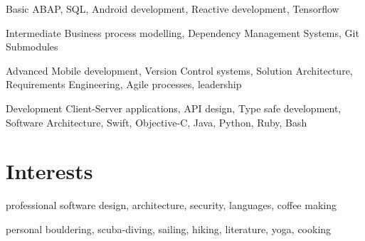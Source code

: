 \documentclass[]{friggeri-cv} %
\begin{document}
\begin{entrylist}

	
	\smallentry
	{Basic}
	{ABAP, SQL, Android development, Reactive development, Tensorflow}
	
	
	\smallentry
	{Intermediate}
	{Business process modelling, Dependency Management Systems, Git Submodules}
	
	
	\smallentry
	{Advanced}
	{Mobile development, Version Control systems, Solution Architecture, Requirements Engineering, Agile processes, leadership}
	
	
	\smallentry
	{Development}
	{Client-Server applications, API design, Type safe development, Software Architecture, Swift, Objective-C, Java, Python, Ruby, Bash}


\end{entrylist}


\section{Interests}

\begin{entrylist}
	\smallentry
	{professional}
	{software design, architecture, security, languages, coffee making}

	\smallentry
	{personal}
	{bouldering, scuba-diving, sailing, hiking, literature, yoga, cooking}
	
\end{entrylist}



\end{document}
